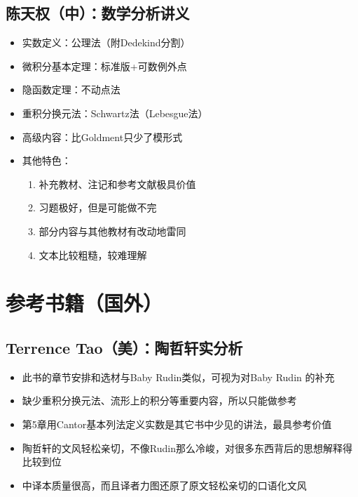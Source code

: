 \documentclass[UTF8]{article}
\begin{document}
    \subsection{陈天权（中）：数学分析讲义}
    \begin{itemize}
        \item 实数定义：公理法（附Dedekind分割）
        \item 微积分基本定理：标准版+可数例外点
        \item 隐函数定理：不动点法
        \item 重积分换元法：Schwartz法（Lebesgue法）
        \item 高级内容：比Goldment只少了模形式
        \item 其他特色：\begin{enumerate}
            \item 补充教材、注记和参考文献极具价值
            \item 习题极好，但是可能做不完
            \item 部分内容与其他教材有改动地雷同
            \item 文本比较粗糙，较难理解
        \end{enumerate}
    \end{itemize}
    \section{参考书籍（国外）}
    \subsection{Terrence Tao（美）：陶哲轩实分析}
    \begin{itemize}
        \item 此书的章节安排和选材与Baby Rudin类似，可视为对Baby Rudin 的补充
        \item 缺少重积分换元法、流形上的积分等重要内容，所以只能做参考
        \item 第5章用Cantor基本列法定义实数是其它书中少见的讲法，最具参考价值
        \item 陶哲轩的文风轻松亲切，不像Rudin那么冷峻，对很多东西背后的思想解释得比较到位
        \item 中译本质量很高，而且译者力图还原了原文轻松亲切的口语化文风
    \end{itemize}
\end{document}
